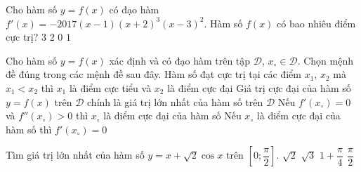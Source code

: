	\begin{ex}%
		Cho hàm số $y=f(x)$ có đạo hàm $f'(x)=-2017(x-1)(x+2)^3(x-3)^2$. Hàm số $f(x)$ có bao nhiêu điểm cực trị?	
		\choice
		{$3$}
		{\True $2$}
		{$0$}
		{$1$}
	\end{ex}
	\begin{ex}%
		Cho hàm số $y=f(x)$ xác định và có đạo hàm trên tập $\mathscr{D}$, $x_\circ\in\mathscr{D}$. Chọn mệnh đề đúng trong các mệnh đề sau đây.
		\choice
		{Hàm số đạt cực trị tại các điểm $x_1$, $x_2$ mà $x_1<x_2$ thì $x_1$ là điểm cực tiểu và $x_2$ là điểm cực đại}
		{Giá trị cực đại của hàm số $y=f(x)$ trên $\mathscr{D}$ chính là giá trị lớn nhất của hàm số trên $\mathscr{D}$}
		{Nếu $f'(x_\circ)=0$ và $f''(x_\circ)>0$ thì $x_\circ$ là điểm cực đại của hàm số}
		{\True Nếu $x_\circ$ là điểm cực đại của hàm số thì $f'(x_\circ)=0$}
	\end{ex}
	\begin{ex}%
		Tìm giá trị lớn nhất của hàm số $y=x+\sqrt{2}\cos x$ trên $\left[0;\dfrac{\pi}{2}\right]$.	
		\choice
		{$\sqrt{2}$}
		{$\sqrt{3}$}
		{\True $1+\dfrac{\pi}{4}$}
		{$\dfrac{\pi}{2}$}
	\end{ex}
	
